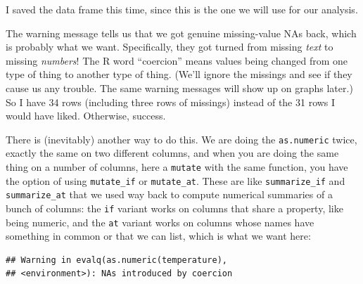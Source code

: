 \documentclass[]{tufte-book}
\newenvironment{Shaded}{}{}
\newcommand{\KeywordTok}[1]{\textcolor[rgb]{0.00,0.44,0.13}{\textbf{#1}}}
\newcommand{\NormalTok}[1]{#1}
\newcommand{\OperatorTok}[1]{\textcolor[rgb]{0.40,0.40,0.40}{#1}}
\newcommand{\StringTok}[1]{\textcolor[rgb]{0.25,0.44,0.63}{#1}}
\theoremstyle{definition}
\theoremstyle{definition}
\theoremstyle{definition}
\theoremstyle{remark}
\begin{document}
I saved the data frame this time, since this is the one we will use for
our analysis.

The warning message tells us that we got genuine missing-value NAs back,
which is probably what we want. Specifically, they got turned from
missing \emph{text} to missing \emph{numbers}!
The R word ``coercion'' means values being changed from one type of
thing to another type of thing. (We'll ignore the missings and see if
they cause us any trouble. The same warning messages will show up on
graphs later.) So I have 34 rows (including three rows of missings)
instead of the 31 rows I would have liked. Otherwise, success.

There is (inevitably) another way to do this. We are doing the
\texttt{as.numeric} twice, exactly the same on two different columns,
and when you are doing the same thing on a number of columns, here a
\texttt{mutate} with the same function, you have the option of using
\texttt{mutate\_if} or \texttt{mutate\_at}. These are like
\texttt{summarize\_if} and \texttt{summarize\_at} that we used way back
to compute numerical summaries of a bunch of columns: the \texttt{if}
variant works on columns that share a property, like being numeric, and
the \texttt{at} variant works on columns whose names have something in
common or that we can list, which is what we want here:

\begin{Shaded}
\end{Shaded}

\begin{verbatim}
## Warning in evalq(as.numeric(temperature),
## <environment>): NAs introduced by coercion
\end{verbatim}
\end{document}
